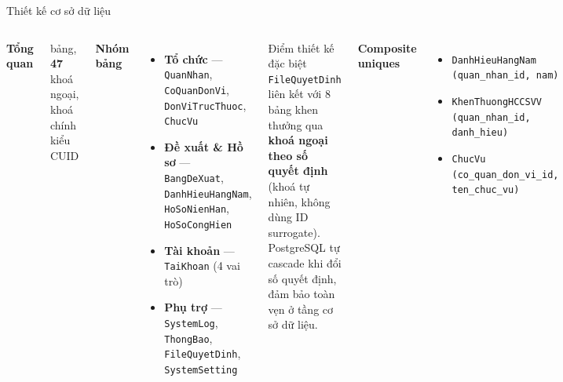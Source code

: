 \documentclass[aspectratio=43,xcolor=table]{beamer}
\begin{document}
\begin{frame}{Thiết kế cơ sở dữ liệu}
  \begin{columns}[T,onlytextwidth]
    \textbf{Tổng quan}\\
    \begin{block}{}
       bảng, \textbf{47} khoá ngoại, khoá chính kiểu CUID
    \end{block}

    \textbf{Nhóm bảng}
    \begin{itemize}\scriptsize
      \item \textbf{Tổ chức} --- \texttt{QuanNhan}, \texttt{CoQuanDonVi}, \texttt{DonViTrucThuoc}, \texttt{ChucVu}
      \item \textbf{Đề xuất \& Hồ sơ} --- \texttt{BangDeXuat}, \texttt{DanhHieuHangNam}, \texttt{HoSoNienHan}, \texttt{HoSoCongHien}
      \item \textbf{Tài khoản} --- \texttt{TaiKhoan} (4 vai trò)
      \item \textbf{Phụ trợ} --- \texttt{SystemLog}, \texttt{ThongBao}, \texttt{FileQuyetDinh}, \texttt{SystemSetting}
    \end{itemize}

    \begin{block}{Điểm thiết kế đặc biệt}
      \scriptsize
      \texttt{FileQuyetDinh} liên kết với 8 bảng khen thưởng qua \textbf{khoá ngoại theo số quyết định} (khoá tự nhiên, không dùng ID surrogate).\\[0.2cm]
      PostgreSQL tự cascade khi đổi số quyết định, đảm bảo toàn vẹn ở tầng cơ sở dữ liệu.
    \end{block}

    \textbf{Composite uniques}
    \begin{itemize}\scriptsize
      \item \texttt{\scriptsize DanhHieuHangNam}\\\hspace*{0.3cm}\texttt{\scriptsize (quan\_nhan\_id, nam)}
      \item \texttt{\scriptsize KhenThuongHCCSVV}\\\hspace*{0.3cm}\texttt{\scriptsize (quan\_nhan\_id, danh\_hieu)}
      \item \texttt{\scriptsize ChucVu}\\\hspace*{0.3cm}\texttt{\scriptsize (co\_quan\_don\_vi\_id, ten\_chuc\_vu)}
    \end{itemize}
  \end{columns}
\end{frame}
\end{document}

